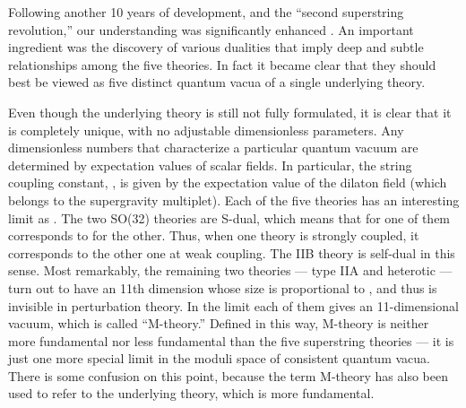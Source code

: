 \documentclass[a4paper,12pt]{article}
\begin{document}
Following another 10 years of development, and the ``second
superstring revolution,'' our understanding was significantly
enhanced \cite{JP}.  An important ingredient was the discovery of various
dualities that imply deep and subtle relationships among the five
theories.  In fact it became clear that they should best be viewed
as five distinct quantum vacua of a single underlying theory.

Even though the underlying theory is still not fully formulated,
it is clear that it is completely unique, with no adjustable
dimensionless parameters. Any dimensionless numbers that
characterize a particular quantum vacuum are determined by
expectation values of scalar fields. In particular, the string
coupling constant, \coordHE{}, is given by the expectation value of the
dilaton field (which belongs to the supergravity multiplet).  Each
of the five theories has an interesting limit as \coordHE{}.  The two SO(32) theories are S-dual, which means that
\coordHE{} for one of them corresponds to \coordHE{} for the other.  Thus,
when one theory is strongly coupled, it corresponds to the other
one at weak coupling. The IIB theory is self-dual in this sense.
Most remarkably, the remaining two theories --- type IIA and \coordHE{} heterotic
--- turn out to have an 11th dimension whose size is proportional
to \coordHE{}, and thus is invisible in perturbation theory.  In the
limit \coordHE{} each of them gives an
11-dimensional vacuum, which is called ``M-theory.''  Defined in
this way, M-theory is neither more fundamental nor less
fundamental than the five superstring theories --- it is just one
more special limit in the moduli space of consistent quantum
vacua.  There is some confusion on this point, because the term
M-theory has also been used to refer to the underlying theory,
which is more fundamental.
\end{document}
